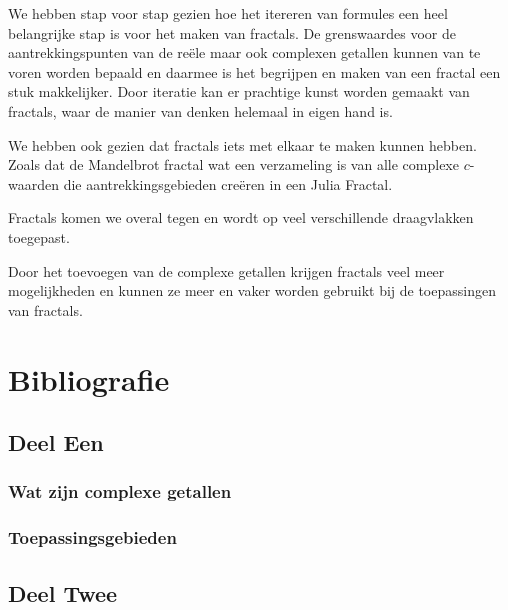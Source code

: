 \documentclass[11pt,fleqn]{book} %
\begin{document}
We hebben stap voor stap gezien hoe het itereren van formules een heel belangrijke stap is voor het maken van fractals. De grenswaardes voor de aantrekkingspunten van de reële maar ook complexen getallen kunnen van te voren worden bepaald en daarmee is het begrijpen en maken van een fractal een stuk makkelijker. Door iteratie kan er prachtige kunst worden gemaakt van fractals, waar de manier van denken helemaal in eigen hand is.

We hebben ook gezien dat fractals iets met elkaar te maken kunnen hebben. Zoals dat de Mandelbrot fractal wat een verzameling is van alle complexe $c$-waarden die aantrekkingsgebieden creëren in een Julia Fractal.

Fractals komen we overal tegen en wordt op veel verschillende draagvlakken toegepast.

Door het toevoegen van de complexe getallen krijgen fractals veel meer mogelijkheden en kunnen ze meer en vaker worden gebruikt bij de toepassingen van fractals. 


\chapter*{Bibliografie}

\section*{Deel Een}
\subsection*{Wat zijn complexe getallen}
\printbibliography[heading=bibempty,keyword=wat_is_het]

\subsection*{Toepassingsgebieden}
\printbibliography[heading=bibempty,keyword=toepassingsgebieden]

\section*{Deel Twee}
\end{document}
